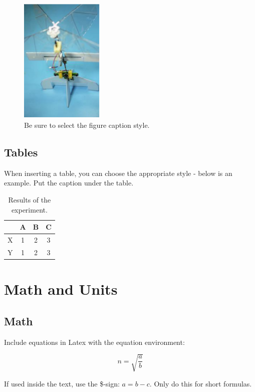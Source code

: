 \documentclass{article}
\begin{document}
\begin{figure}[hbt]
\centering
\includegraphics[width=4cm]{DelFlyExplorer.eps}
\caption{Be sure to select the figure caption style.}
\label{figure:DelFly_Explorer}
\end{figure}

\subsection{Tables}
When inserting a table, you can choose the appropriate style - below is an example. Put the caption under the table.

\begin{table}[hbt]
\begin{center}
\begin{tabular}{|l|c|c|c|}
\hline
& A & B& C\\
\hline
X & 1 & 2 & 3\\
Y & 1 & 2 & 3\\
\hline
\end{tabular}
\caption{Results of the experiment.}
\label{table:results}
\end{center}
\end{table}

\section{Math and Units}

\subsection{Math}
Include equations in Latex with the equation environment:

\begin{equation} \label{equation:n}
n = \sqrt{\frac{a}{b}}
\end{equation}

If used inside the text, use the \$-sign: $a =  b-c$. Only do this for short formulas.
\end{document}
